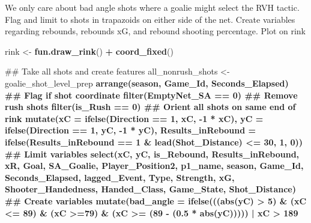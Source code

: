 \documentclass[]{article}
\newenvironment{Shaded}{\begin{snugshade}}{\end{snugshade}}
\newcommand{\KeywordTok}[1]{\textcolor[rgb]{0.13,0.29,0.53}{\textbf{#1}}}
\newcommand{\DataTypeTok}[1]{\textcolor[rgb]{0.13,0.29,0.53}{#1}}
\newcommand{\DecValTok}[1]{\textcolor[rgb]{0.00,0.00,0.81}{#1}}
\newcommand{\FloatTok}[1]{\textcolor[rgb]{0.00,0.00,0.81}{#1}}
\newcommand{\StringTok}[1]{\textcolor[rgb]{0.31,0.60,0.02}{#1}}
\newcommand{\OperatorTok}[1]{\textcolor[rgb]{0.81,0.36,0.00}{\textbf{#1}}}
\newcommand{\NormalTok}[1]{#1}
\begin{document}
We only care about bad angle shots where a goalie might select the RVH
tactic. Flag and limit to shots in trapazoids on either side of the net.
Create variables regarding rebounds, rebounds xG, and rebound shooting
percentage. Plot on rink

\begin{Shaded}
\begin{Highlighting}[]
\NormalTok{rink <-}\StringTok{ }\KeywordTok{fun.draw_rink}\NormalTok{() }\OperatorTok{+}\StringTok{ }\KeywordTok{coord_fixed}\NormalTok{()}

\NormalTok{## Take all shots and create features}
\NormalTok{all_nonrush_shots <-}\StringTok{ }\NormalTok{goalie_shot_level_prep }\OperatorTok{%>%}
\StringTok{      }\KeywordTok{arrange}\NormalTok{(season, Game_Id, Seconds_Elapsed) }\OperatorTok{%>%}
\StringTok{      }\NormalTok{## Flag if shot coordinate}
\StringTok{      }\KeywordTok{filter}\NormalTok{(EmptyNet_SA }\OperatorTok{==}\StringTok{ }\DecValTok{0}\NormalTok{) }\OperatorTok{%>%}
\StringTok{      }\NormalTok{## Remove rush shots}
\StringTok{      }\KeywordTok{filter}\NormalTok{(is_Rush }\OperatorTok{==}\StringTok{ }\DecValTok{0}\NormalTok{) }\OperatorTok{%>%}
\StringTok{      }\NormalTok{## Orient all shots on same end of rink}
\StringTok{      }\KeywordTok{mutate}\NormalTok{(}\DataTypeTok{xC =} \KeywordTok{ifelse}\NormalTok{(Direction }\OperatorTok{==}\StringTok{ }\DecValTok{1}\NormalTok{, xC, }\OperatorTok{-}\DecValTok{1} \OperatorTok{*}\StringTok{ }\NormalTok{xC),}
             \DataTypeTok{yC =} \KeywordTok{ifelse}\NormalTok{(Direction }\OperatorTok{==}\StringTok{ }\DecValTok{1}\NormalTok{, yC, }\OperatorTok{-}\DecValTok{1} \OperatorTok{*}\StringTok{ }\NormalTok{yC),}
             \DataTypeTok{Results_inRebound =} \KeywordTok{ifelse}\NormalTok{(Results_inRebound }\OperatorTok{==}\StringTok{ }\DecValTok{1} \OperatorTok{&}\StringTok{ }\KeywordTok{lead}\NormalTok{(Shot_Distance) }\OperatorTok{<=}\StringTok{ }\DecValTok{30}\NormalTok{, }\DecValTok{1}\NormalTok{, }\DecValTok{0}\NormalTok{)) }\OperatorTok{%>%}
\StringTok{      }\NormalTok{## Limit variables}
\StringTok{      }\KeywordTok{select}\NormalTok{(xC, yC, is_Rebound, Results_inRebound, xR, Goal, SA_Goalie, Player_Position2, p1_name, season, Game_Id, Seconds_Elapsed, lagged_Event, Type, Strength, xG, Shooter_Handedness, Handed_Class, Game_State, Shot_Distance) }\OperatorTok{%>%}
\StringTok{      }\NormalTok{## Create variables}
\StringTok{      }\KeywordTok{mutate}\NormalTok{(}\DataTypeTok{bad_angle =} \KeywordTok{ifelse}\NormalTok{(((}\KeywordTok{abs}\NormalTok{(yC) }\OperatorTok{>}\StringTok{ }\DecValTok{5}\NormalTok{) }\OperatorTok{&}\StringTok{ }\NormalTok{(xC }\OperatorTok{<=}\StringTok{ }\DecValTok{89}\NormalTok{) }\OperatorTok{&}\StringTok{ }\NormalTok{(xC }\OperatorTok{>=}\DecValTok{79}\NormalTok{) }\OperatorTok{&}\StringTok{ }\NormalTok{(xC }\OperatorTok{>=}\StringTok{ }\NormalTok{(}\DecValTok{89} \OperatorTok{-}\StringTok{ }\NormalTok{(}\FloatTok{0.5} \OperatorTok{*}\StringTok{ }\KeywordTok{abs}\NormalTok{(yC))))) }\OperatorTok{|}\StringTok{ }\NormalTok{xC }\OperatorTok{>}\StringTok{ }\DecValTok{189}
}}}}}}
\end{Highlighting}
\end{Shaded}
\end{document}
